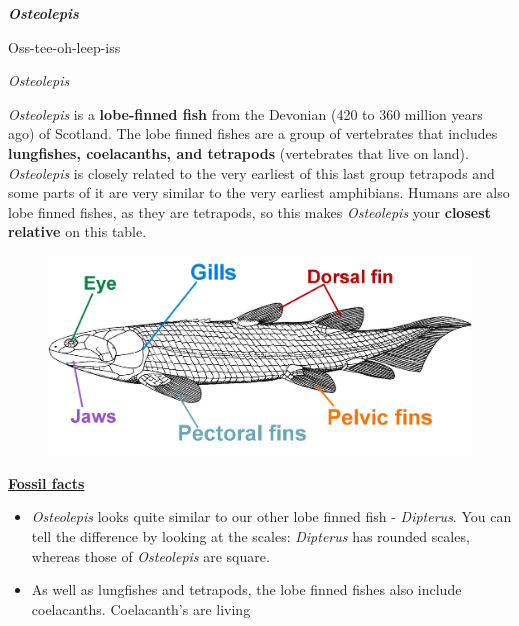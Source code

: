\documentclass[12pt,letterpaper]{article}
\begin{document}

{\Huge\textbf{\textit{Osteolepis}}\par}
\vspace{3mm}
{\large{Oss-tee-oh-leep-iss} \par} 
\vspace{5mm}
\textit{Osteolepis}

\textit{Osteolepis} is a \textbf{lobe-finned fish} from the Devonian (420 to 360 million years ago) of Scotland.  The lobe finned fishes are a group of vertebrates that includes \textbf{lungfishes, coelacanths, and tetrapods} (vertebrates that live on land).  \textit{Osteolepis} is closely related to the very earliest of this last group tetrapods and some parts of it are very similar to the very earliest amphibians.  Humans are also lobe finned fishes, as they are tetrapods, so this makes \textit{Osteolepis} your \textbf{closest relative} on this table.

\begin{figure}[h!]
\includegraphics[scale=0.8]{Osteolepis.png}
\centering
\end{figure}

{\large\textbf{\underline{Fossil facts}}\par}

\begin{itemize}
  \item \textit{Osteolepis} looks quite similar to our other lobe finned fish - \textit{Dipterus}.  You can tell the difference by looking at the scales: \textit{Dipterus} has rounded scales, whereas those of \textit{Osteolepis} are square.
  \item As well as lungfishes and tetrapods, the lobe finned fishes also include coelacanths.  Coelacanth's are living 
\end{itemize}
\end{document}
